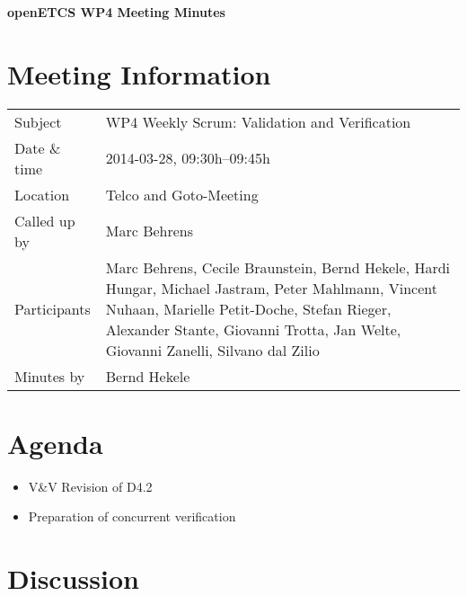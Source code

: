 \documentclass[a4paper, 11pt]{article}
\begin{document}
{\begin{center}\huge\bf openETCS WP4 Meeting Minutes\end{center}}
\section{Meeting Information}

\renewcommand{\arraystretch}{1.5}
\begin{supertabular}{m{.2\textwidth}m{.8\textwidth}}
Subject & WP4 Weekly Scrum: Validation and Verification\\
Date \& time & 2014-03-28, 09:30h--09:45h\\
Location & Telco and Goto-Meeting\\
Called up by & Marc Behrens\\
Participants &
Marc Behrens,
Cecile Braunstein,
Bernd Hekele,
Hardi Hungar,
Michael Jastram,
Peter Mahlmann,
Vincent Nuhaan,
Marielle Petit-Doche,
Stefan Rieger,
Alexander Stante,
Giovanni Trotta,
Jan Welte,
Giovanni Zanelli,
Silvano dal Zilio
\\

Minutes by & Bernd Hekele\\

\end{supertabular}
\renewcommand{\arraystretch}{1.0}


\section{{Agenda}}
\begin{itemize}
\item V\&V Revision of D4.2
\item Preparation of concurrent verification
\end{itemize}

\section{Discussion}
\end{document}
